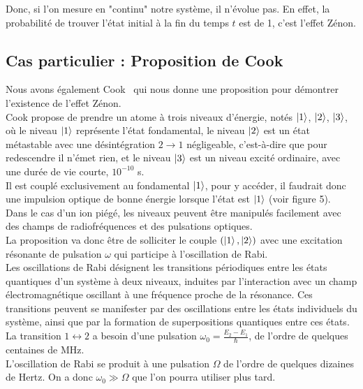 \documentclass[11pt]{article}
\begin{document}
Donc, si l'on mesure en "continu" notre système, il n'évolue pas. En effet, la probabilité de trouver l'état initial à la fin du temps $t$ est de 1, c'est l'effet Zénon.

\newpage

\subsection{Cas particulier : Proposition de Cook}

\qquad Nous avons également Cook~\cite{cook} qui nous donne une proposition pour démontrer l'existence de l'effet Zénon. \\
Cook propose de prendre un atome à trois niveaux d'énergie, notés $\ket{1}$, $\ket{2}$, $\ket{3}$,\\
où le niveau $\ket{1}$ représente l'état fondamental, le niveau $\ket{2}$ est un état métastable avec une désintégration $2 \rightarrow 1$ négligeable, c'est-à-dire que pour redescendre il n'émet rien, et le niveau $\ket{3}$ est un niveau excité ordinaire, avec une durée de vie courte, $10^{-10}$ s.\\
Il est couplé exclusivement au fondamental $\ket{1}$, pour y accéder, il faudrait donc une impulsion optique de bonne énergie lorsque l'état est $\ket{1}$ (voir figure 5).\\
\vspace{0.5cm}
\qquad Dans le cas d'un ion piégé, les niveaux peuvent être manipulés facilement avec des champs de radiofréquences et des pulsations optiques.\\
La proposition va donc être de solliciter le couple $(\ket{1}, \ket{2})$ avec une excitation résonante de pulsation $\omega$ qui participe à l'oscillation de Rabi.\\
\qquad Les oscillations de Rabi désignent les transitions périodiques entre les états quantiques d'un système à deux niveaux, induites par l'interaction avec un champ électromagnétique oscillant à une fréquence proche de la résonance. Ces transitions peuvent se manifester par des oscillations entre les états individuels du système, ainsi que par la formation de superpositions quantiques entre ces états.\\
La transition $1 \leftrightarrow 2$ a besoin d'une pulsation $\omega_{0} = \frac{E_2 - E_1}{\hbar}$, de l'ordre de quelques centaines de MHz.\\
L'oscillation de Rabi se produit à une pulsation $\Omega$ de l'ordre de quelques dizaines de Hertz. On a donc $\omega_{0} \gg \Omega$ que l'on pourra utiliser plus tard.\\
\end{document}
